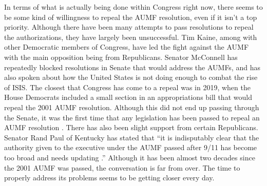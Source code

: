 \documentclass[12pt]{article}
\begin{document}
In terms of what is actually being done within Congress right now, there seems to be some kind of willingness to repeal the AUMF resolution, even if it isn't a top priority.
Although there have been many attempts to pass resolutions to repeal the authorizations, they have largely been unsuccessful.
Tim Kaine, among with other Democratic members of Congress, have led the fight against the AUMF with the main opposition being from Republicans.
Senator McConnell has repeatedly blocked resolutions in Senate that would address the AUMFs, and has also spoken about how the United States is not doing enough to combat the rise of ISIS\@.
The closest that Congress has come to a repeal was in 2019, when the House Democrats included a small section in an appropriations bill that would repeal the 2001 AUMF resolution.
Although this did not end up passing through the Senate, it was the first time that any legislation has been passed to repeal an AUMF resolution \autocite{fuller2019}.
There has also been slight support from certain Republicans.
Senator Rand Paul of Kentucky has stated that ``it is indisputably clear that the authority given to the executive under the AUMF passed after 9/11 has become too broad and needs updating \autocite{paul2018}.''
Although it has been almost two decades since the 2001 AUMF was passed, the conversation is far from over.
The time to properly address its problems seems to be getting closer every day.


\newpage
{}
\printbibliography[heading=none]{}
\end{document}
